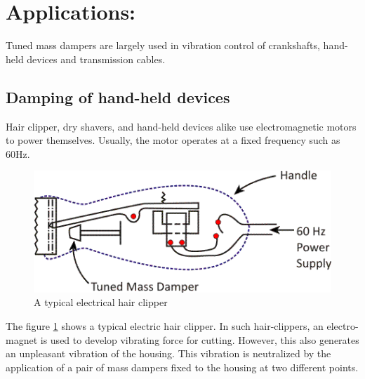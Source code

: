 \section{Applications:}
Tuned mass dampers are largely used in vibration control of crankshafts, hand-held devices and
transmission cables.
\subsection{Damping of hand-held devices}
Hair clipper, dry shavers, and hand-held devices alike use electromagnetic motors to power themselves. Usually, the motor operates at a fixed frequency such as 60Hz. 
\begin{figure}[h]
\centering
\includegraphics[scale=0.9]{"figures/eclipper"}
\caption{A typical electrical hair clipper}
\label{eclipper}
\end{figure}
The figure \ref{eclipper} shows a typical electric hair clipper. In such hair-clippers, an electro-magnet is used to develop vibrating force for cutting. However, this also generates an unpleasant vibration of
the housing. This vibration is neutralized by the application of a pair of mass dampers fixed to the
housing at two different points.

